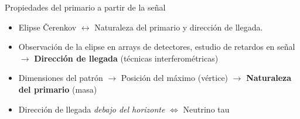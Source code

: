\documentclass{beamer}
\begin{document}
\begin{frame}{Propiedades del primario a partir de la señal}
	\begin{itemize}
		\item Elipse \v{C}erenkov $\leftrightarrow$ Naturaleza del primario y dirección de llegada.
		\item Observación de la elipse en arrays de detectores, estudio de retardos en señal $\rightarrow$ \textbf{Dirección de llegada} (técnicas interferométricas)
		\item Dimensiones del patrón $\rightarrow$ Posición del máximo (vértice) $\rightarrow$ \textbf{Naturaleza del primario} (masa)
		\item Dirección de llegada \textit{debajo del horizonte} $\Longleftrightarrow$ Neutrino tau
	\end{itemize}
\end{frame}
\end{document}
